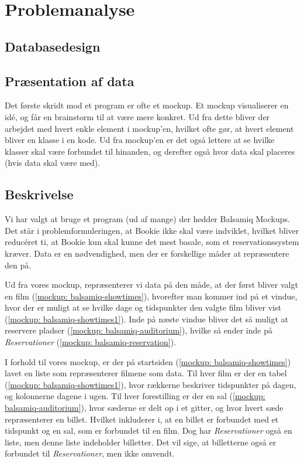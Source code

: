\chapter{Problemanalyse}

\section{Databasedesign}

\section{Præsentation af data}

Det første skridt mod et program er ofte et mockup. Et mockup visualiserer en idé, og får en brainstorm til at være mere konkret. Ud fra dette bliver der arbejdet med hvert enkle element i mockup'en, hvilket ofte gør, at hvert element bliver en klasse i en kode. Ud fra mockup'en er det også lettere at se hvilke klasser skal være forbundet til hinanden, og derefter også hvor data skal placeres (hvis data skal være med).

\section{Beskrivelse}

Vi har valgt at bruge et program (ud af mange) der hedder Balsamiq Mockups.
Det står i problemformuleringen, at Bookie ikke skal være indviklet, hvilket bliver reducéret ti, at Bookie kun skal kunne det mest basale, som et reservationssystem kræver. Data er en nødvendighed, men der er forskellige måder at repræsentere den på.

Ud fra vores mockup, repræsenterer vi data på den måde, at der først bliver valgt en film (\ref{mockup: balsamiq-showtimes}), hvorefter man kommer ind på et vindue, hvor der er muligt at se hvilke dage og tidspunkter den valgte film bliver vist (\ref{mockup: balsamiq-showtimes1}). Inde på næste vindue bliver det så muligt at reservere pladser (\ref{mockup: balsamiq-auditorium}), hvilke så ender inde på \textit{Reservationer} (\ref{mockup: balsamiq-reservation}).

I forhold til vores mockup, er der på startsiden (\ref{mockup: balsamiq-showtimes}) lavet en liste som repræsenterer filmene som data. Til hver film er der en tabel (\ref{mockup: balsamiq-showtimes1}), hvor rækkerne beskriver tidspunkter på dagen, og kolonnerne dagene i ugen. Til hver forestilling er der en sal (\ref{mockup: balsamiq-auditorium}), hvor sæderne er delt op i et gitter, og hvor hvert sæde repræsenterer en billet. Hvilket inkluderer i, at en billet er forbundet med et tidspunkt og en sal, som er forbundet til en film. Dog har \textit{Reservationer} også en liste, men denne liste indeholder billetter. Det vil sige, at billetterne også er forbundet til \textit{Reservationer}, men ikke omvendt.

